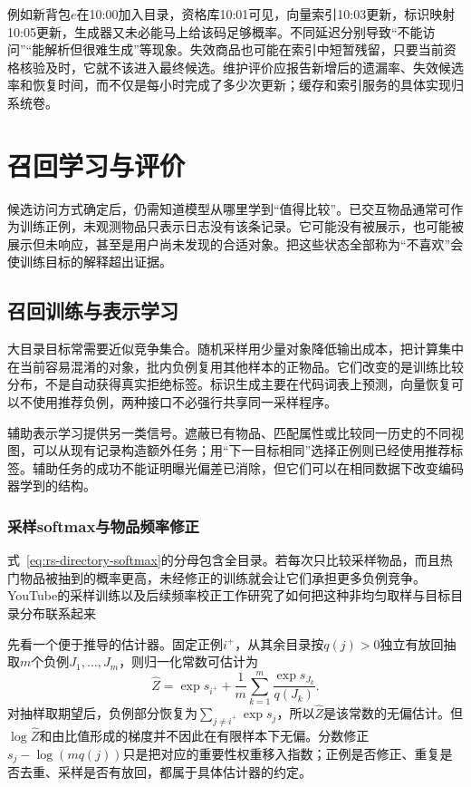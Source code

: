 例如新背包$e$在10:00加入目录，资格库10:01可见，向量索引10:03更新，标识映射10:05更新，生成器又未必能马上给该码足够概率。不同延迟分别导致“不能访问”“能解析但很难生成”等现象。失效商品也可能在索引中短暂残留，只要当前资格核验及时，它就不该进入最终候选。维护评价应报告新增后的遗漏率、失效候选率和恢复时间，而不仅是每小时完成了多少次更新；缓存和索引服务的具体实现归系统卷。

\section{召回学习与评价}
\label{sec:rs-retrieval-learning}

候选访问方式确定后，仍需知道模型从哪里学到“值得比较”。已交互物品通常可作为训练正例，未观测物品只表示日志没有该条记录。它可能没有被展示，也可能被展示但未响应，甚至是用户尚未发现的合适对象。把这些状态全部称为“不喜欢”会使训练目标的解释超出证据。

\subsection{召回训练与表示学习}
\label{sec:rs-retrieval-training}

大目录目标常需要近似竞争集合。随机采样用少量对象降低输出成本，把计算集中在当前容易混淆的对象，批内负例复用其他样本的正物品。它们改变的是训练比较分布，不是自动获得真实拒绝标签。标识生成主要在代码词表上预测，向量恢复可以不使用推荐负例，两种接口不必强行共享同一采样程序。

辅助表示学习提供另一类信号。遮蔽已有物品、匹配属性或比较同一历史的不同视图，可以从现有记录构造额外任务；用“下一目标相同”选择正例则已经使用推荐标签。辅助任务的成功不能证明曝光偏差已消除，但它们可以在相同数据下改变编码器学到的结构。

\Needspace{125mm}
\subsubsection{采样softmax与物品频率修正}
\label{sec:rs-sampled-softmax}

式~\eqref{eq:rs-directory-softmax}的分母包含全目录。若每次只比较采样物品，而且热门物品被抽到的概率更高，未经修正的训练就会让它们承担更多负例竞争。YouTube的采样训练以及后续频率校正工作研究了如何把这种非均匀取样与目标目录分布联系起来

先看一个便于推导的估计器。固定正例$i^+$，从其余目录按$q(j)>0$独立有放回抽取$m$个负例$J_1,\ldots,J_m$，则归一化常数可估计为
\begin{equation}
 \widehat Z=\exp s_{i^+}
       +\frac1m\sum_{k=1}^{m}\frac{\exp s_{J_k}}{q(J_k)}.
 \label{eq:rs-softmax-estimator}
\end{equation}
对抽样取期望后，负例部分恢复为$\sum_{j\ne i^+}\exp s_j$，所以$\widehat Z$是该常数的无偏估计。但$\log\widehat Z$和由比值形成的梯度并不因此在有限样本下无偏。分数修正$s_j-\log(mq(j))$只是把对应的重要性权重移入指数；正例是否修正、重复是否去重、采样是否有放回，都属于具体估计器的约定。

